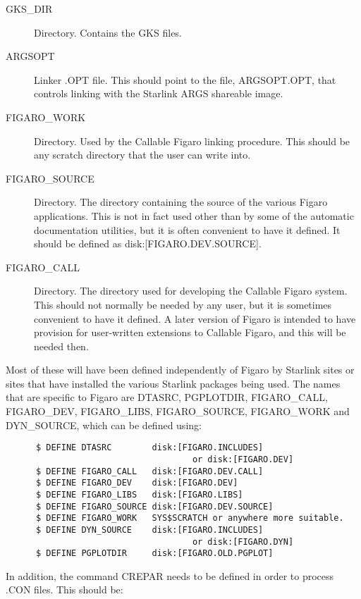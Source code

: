 \begin{description}
\item [GKS\_DIR] Directory. Contains the GKS files.

\item [ARGSOPT] Linker .OPT file. This should point to the file, ARGSOPT.OPT,
that controls linking with the Starlink ARGS shareable image.

\item [FIGARO\_WORK] Directory. Used by the Callable Figaro linking procedure.
This should be any scratch directory that the user can write into.

\item [FIGARO\_SOURCE] Directory. The directory containing the source of the
various Figaro applications. This is not in fact used other than by some  of
the automatic documentation utilities, but it is often convenient to have it
defined. It should be defined as disk:[FIGARO.DEV.SOURCE].

\item [FIGARO\_CALL] Directory. The directory used for developing the Callable
Figaro system. This should not normally be needed by any user, but it is
sometimes convenient to have it defined. A later version of Figaro is intended
to have provision for user-written extensions to Callable Figaro, and this will
be needed then.

\end{description}

Most of these will have been defined independently of Figaro by Starlink sites
or sites that have installed the various Starlink packages being used. The
names that are specific to Figaro are DTASRC, PGPLOTDIR, FIGARO\_CALL,
FIGARO\_DEV, FIGARO\_LIBS, FIGARO\_\-SOURCE, FIGARO\_WORK and  DYN\_SOURCE,
which can be defined using:

\begin{verbatim}
      $ DEFINE DTASRC        disk:[FIGARO.INCLUDES]
                                     or disk:[FIGARO.DEV]
      $ DEFINE FIGARO_CALL   disk:[FIGARO.DEV.CALL]
      $ DEFINE FIGARO_DEV    disk:[FIGARO.DEV]
      $ DEFINE FIGARO_LIBS   disk:[FIGARO.LIBS]
      $ DEFINE FIGARO_SOURCE disk:[FIGARO.DEV.SOURCE]
      $ DEFINE FIGARO_WORK   SYS$SCRATCH or anywhere more suitable.
      $ DEFINE DYN_SOURCE    disk:[FIGARO.INCLUDES]
                                     or disk:[FIGARO.DYN]
      $ DEFINE PGPLOTDIR     disk:[FIGARO.OLD.PGPLOT]
\end{verbatim}

In addition, the command CREPAR needs to be defined in order to process .CON
files. This should be:

